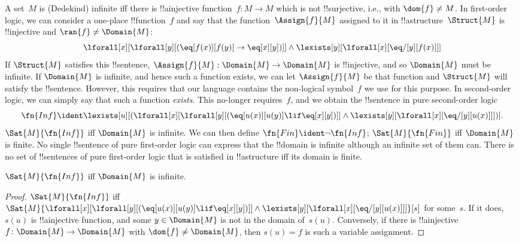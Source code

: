 \documentclass[../../../include/open-logic-section]{subfiles}
\begin{document}


A set~$M$ is (Dedekind) infinite iff there is !!a{injective} function~$f\colon M
\to M$ which is not !!{surjective}, i.e., with $\dom{f} \neq M$. In
first-order logic, we can consider a one-place !!{function}~$f$ and
say that the function~$\Assign{f}{M}$ assigned to it in
!!a{structure}~$\Struct{M}$ is !!{injective} and $\ran{f} \neq
\Domain{M}$:
\[
\lforall[x][\lforall[y][(\eq[f(x)][f(y)] \to \eq[x][y])]] \land
\lexists[y][\lforall[x][\eq/[y][f(x)]]]
\]
If $\Struct{M}$ satisfies this !!{sentence}, $\Assign{f}{M}:
\Domain{M} \to \Domain{M}$ is !!{injective}, and so $\Domain{M}$ must
be infinite. If $\Domain{M}$ is infinite, and hence such a function
exists, we can let $\Assign{f}{M}$ be that function and $\Struct{M}$
will satisfy the !!{sentence}.  However, this requires that our language
contains the non-logical symbol~$f$ we use for this purpose. In
second-order logic, we can simply say that such a function
\emph{exists}. This no-longer requires~$f$, and we obtain the
!!{sentence} in pure second-order logic
\[
\fn{Inf} \ident \lexists[u][(\lforall[x][\lforall[y][(\eq[u(x)][u(y)]
      \lif \eq[x][y])]] \land \lexists[y][\lforall[x][\eq/[y][u(x)]]])].
\]
$\Sat{M}{\fn{Inf}}$ iff $\Domain{M}$ is infinite.  We can then define
$\fn{Fin} \ident \lnot \fn{Inf}$; $\Sat{M}{\fn{Fin}}$ iff $\Domain{M}$
is finite. No single !!{sentence} of pure first-order logic can
express that the !!{domain} is infinite although an infinite set of
them can. There is no set of !!{sentence}s of pure first-order logic
that is satisfied in !!a{structure} iff its domain is finite.

\begin{prop}
$\Sat{M}{\fn{Inf}}$ iff $\Domain{M}$ is infinite.
\end{prop}

\begin{proof}
$\Sat{M}{\fn{Inf}}$ iff
  $\Sat{M}{\lforall[x][\lforall[y][(\eq[u(x)][u(y)] \lif \eq[x][y])]]
    \land \lexists[y][\lforall[x][\eq/[y][u(x)]]]}[s]$ for
  some~$s$. If it does, $s(u)$ is !!a{injective} function, and some $y
  \in \Domain{M}$ is not in the domain of~$s(u)$. Conversely, if there
  is !!a{injective} $f\colon \Domain{M} \to \Domain{M}$ with $\dom{f}
  \neq \Domain{M}$, then $s(u) = f$ is such a variable
  assignment.
\end{proof}
\end{document}
